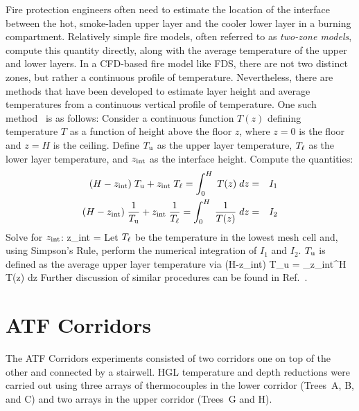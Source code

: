 Fire protection engineers often need to estimate the location of the interface between the hot, smoke-laden upper layer and the cooler lower layer in a burning compartment.  Relatively simple fire models, often referred to as {\em two-zone models}, compute this quantity directly, along with the average temperature of the upper and lower layers.  In a CFD-based fire model like FDS, there are not two distinct zones, but rather a continuous profile of temperature. Nevertheless, there are methods that have been developed to estimate layer height and average temperatures from a continuous vertical profile of temperature. One such method~\cite{Janssens:JFS1992} is as follows: Consider a continuous function $T(z)$ defining temperature $T$ as a function of height above the floor $z$, where $z=0$ is the floor and $z=H$ is the ceiling. Define $T_{\rm u}$ as the upper layer temperature, $T_{\rm \ell}$ as the lower layer temperature, and $z_{\rm int}$ as the interface height. Compute the quantities:
\begin{eqnarray*} (H-z_{\rm int})\; T_{\rm u} + z_{\rm int} \; T_{\rm \ell} = \int_0^H \; T(z) \; dz &=& I_1 \\
                  (H-z_{\rm int})\; \frac{1}{T_{\rm u}} + z_{\rm int} \; \frac{1}{T_{\rm \ell}} = \int_0^H \; \frac{1}{T(z)} \; dz &=& I_2 \end{eqnarray*}
Solve for $z_{\rm int}$:
\be
   z_{\rm int} = 
\ee
Let $T_{\rm \ell}$ be the temperature in the lowest mesh cell and, using Simpson's Rule, perform the numerical integration of $I_1$ and $I_2$. $T_{\rm u}$ is defined as the average upper layer temperature via
\be
   (H-z_{\rm int})\; T_{\rm u} = \int_{z_{\rm int}}^H \; T(z) \; dz
\ee
Further discussion of similar procedures can be found in Ref.~\cite{He:1}.

\newpage


\section{ATF Corridors}

The ATF Corridors experiments consisted of two corridors one on top of the other and connected by a stairwell. HGL temperature and depth reductions were carried out using three arrays of thermocouples in the lower corridor (Trees~A, B, and C) and two arrays in the upper corridor (Trees~G and H).

